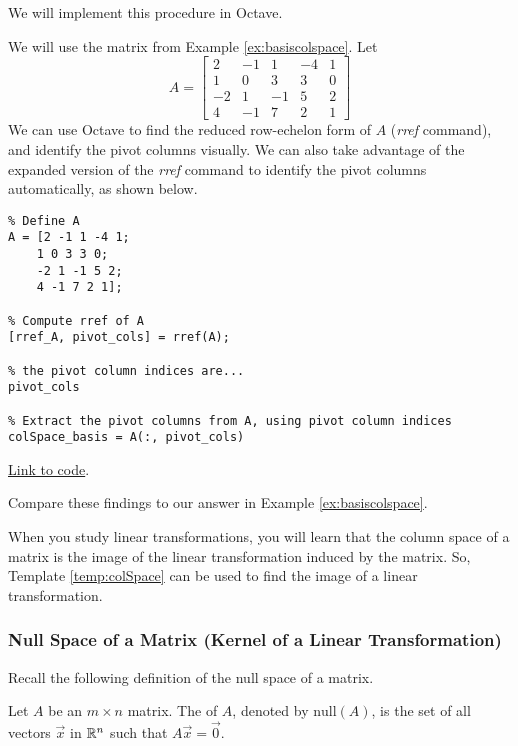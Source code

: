 \documentclass{ximera}
\begin{document}
We will implement this procedure in Octave.

\begin{template}\label{temp:colSpace}
We will use the matrix from Example \ref{ex:basiscolspace}.  Let $$A=\begin{bmatrix}2&-1&1&-4&1\\1&0&3&3&0\\-2&1&-1&5&2\\4&-1&7&2&1\end{bmatrix}$$
We can use Octave to find the reduced row-echelon form of $A$ (\emph{rref} command), and identify the pivot columns visually.  We can also take advantage of the expanded version of the \emph{rref} command to identify the pivot columns automatically, as shown below.

\begin{verbatim}
% Define A
A = [2 -1 1 -4 1;
    1 0 3 3 0;
    -2 1 -1 5 2;
    4 -1 7 2 1];

% Compute rref of A
[rref_A, pivot_cols] = rref(A);

% the pivot column indices are...
pivot_cols

% Extract the pivot columns from A, using pivot column indices
colSpace_basis = A(:, pivot_cols)
\end{verbatim}

\href{https://sagecell.sagemath.org/?z=eJxtTkEKwjAQvAfyh7kULNhiqiIoHoL6Ao9SSq2JBmxTklR8vhssKOjuZWeGmdkEe6VNpyA5k9jiVCATEMgWEBvOQCMww5x2NuKsiLrAEsXILCJcgfiSGM4S7GzbD0HBOaVhdUw_xbuSU_TmYUPV2LsvqTCyE5mOvnBTbx2kD20H011Mozxqp_I85-xjfhsOz-DqJvwYPbSzLahu8Ka7_g3ljPCxrxtVnWtvPH0jJ-vvB9MX3FlRVA==&lang=octave&interacts=eJyLjgUAARUAuQ==}{Link to code}.

Compare these findings to our answer in Example \ref{ex:basiscolspace}.
\end{template}  

When you study linear transformations, you will learn that the column space of a matrix is the image of the linear transformation induced by the matrix.  So, Template \ref{temp:colSpace} can be used to find the image of a linear transformation.

\subsubsection*{Null Space of a Matrix (Kernel of a Linear Transformation)}

Recall the following definition of the null space of a matrix.
\begin{definition}[\ref{def:nullspace}] Let $A$ be an $m\times n$ matrix.  The  of $A$, denoted by $\mbox{null}(A)$, is the set of all vectors $\vec{x}$ in $\mathbb{R}^n$ such that $A\vec{x}=\vec{0}$.
\end{definition}
\end{document}
